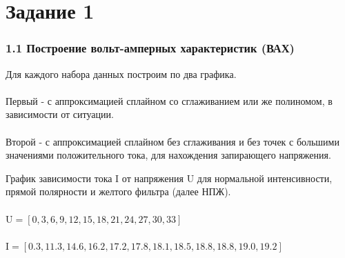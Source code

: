 \documentclass[12pt,openany]{book}
\title{\booktitle}
\author{\authorname}
\begin{document}


\chapter*{Задание 1}

\subsection*{1.1 Построение вольт-амперных характеристик (ВАХ)}

\vspace{10pt}

\noindent Для каждого набора данных построим по два графика.\\\\
Первый - с аппроксимацией сплайном со сглаживанием 
или же полиномом, в зависимости от ситуации.\\\\
Второй - с аппроксимацией сплайном без сглаживания и без точек с 
большими значениями положительного тока, для нахождения запирающего
напряжения.

\newpage

\noindent График зависимости тока I от напряжения U для нормальной интенсивности, 
прямой полярности и желтого фильтра (далее НПЖ).\\\\
$\text{U} = [0, 3, 6, 9, 12, 15, 18, 21, 24, 27, 30, 33]$\\\\
$\text{I} = [0.3, 11.3, 14.6, 16.2, 17.2, 17.8, 18.1, 18.5, 18.8, 18.8, 19.0, 19.2]$
\end{document}
